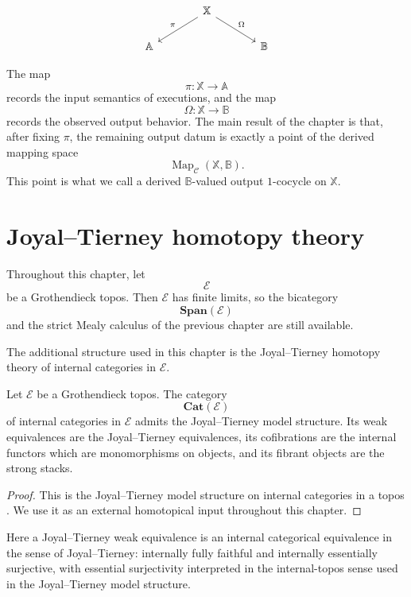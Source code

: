 \[
\begin{tikzcd}[column sep=large]
&
\mathbb X
\arrow[dl, "\pi"']
\arrow[dr, "\Omega"]
&
\\
\mathbb A
&
&
\mathbb B
\end{tikzcd}
\]

The map
\[
\pi:\mathbb X\to\mathbb A
\]
records the input semantics of executions, and the map
\[
\Omega:\mathbb X\to\mathbb B
\]
records the observed output behavior. The main result of the chapter is
that, after fixing \(\pi\), the remaining output datum is exactly a point
of the derived mapping space
\[
\operatorname{Map}_{\mathcal C}(\mathbb X,\mathbb B).
\]
This point is what we call a derived \(\mathbb B\)-valued output
\(1\)-cocycle on \(\mathbb X\).

\section{Joyal--Tierney homotopy theory}
\label{sec:derived-mealy-jt-homotopy-theory}

Throughout this chapter, let
\[
\mathcal E
\]
be a Grothendieck topos. Then \(\mathcal E\) has finite limits, so the
bicategory
\[
\mathbf{Span}(\mathcal E)
\]
and the strict Mealy calculus of the previous chapter are still
available.

The additional structure used in this chapter is the Joyal--Tierney
homotopy theory of internal categories in \(\mathcal E\).

\begin{theorem}
\label{thm:joyal-tierney-model-structure-derived}
Let \(\mathcal E\) be a Grothendieck topos. The category
\[
\mathbf{Cat}(\mathcal E)
\]
of internal categories in \(\mathcal E\) admits the Joyal--Tierney model
structure. Its weak equivalences are the Joyal--Tierney equivalences, its
cofibrations are the internal functors which are monomorphisms on
objects, and its fibrant objects are the strong stacks.
\end{theorem}

\begin{proof}
This is the Joyal--Tierney model structure on internal categories in a
topos \cite{JoyalTierneyStrongStacks}. We use it as an external
homotopical input throughout this chapter.
\end{proof}

Here a Joyal--Tierney weak equivalence is an internal categorical
equivalence in the sense of Joyal--Tierney: internally fully faithful and
internally essentially surjective, with essential surjectivity interpreted
in the internal-topos sense used in the Joyal--Tierney model structure.

